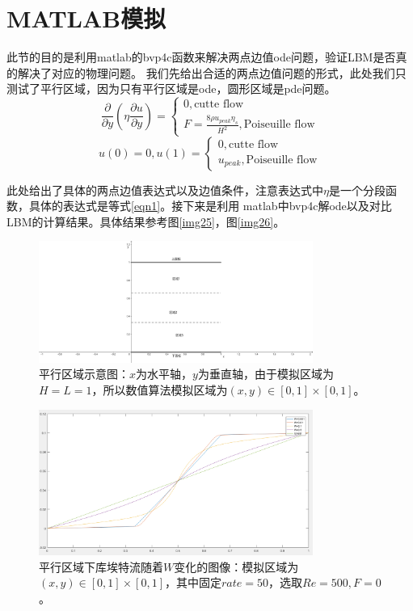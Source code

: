 \documentclass[11pt,UTF8]{ctexart}
\begin{document}
    \section{MATLAB模拟}
    \par{此节的目的是利用matlab的bvp4c函数来解决两点边值ode问题，验证LBM是否真的解决了对应的物理问题。
    我们先给出合适的两点边值问题的形式，此处我们只测试了平行区域，因为只有平行区域是ode，圆形区域是pde问题。}
    $$
    \frac{\partial}{\partial y} (\eta \frac{\partial u}{\partial y})=
    \begin{cases}
        0,\text{cutte flow}\\
        F = \frac{8\rho u_{peak} \eta_s}{H^2},\text{Poiseuille flow}
    \end{cases}
    $$
    $$
    u(0) = 0,u(1)=
    \begin{cases}
        0,\text{cutte flow}\\
        u_{peak},\text{Poiseuille flow}
    \end{cases}
    $$
    \par{此处给出了具体的两点边值表达式以及边值条件，注意表达式中$\eta$是一个分段函数，具体的表达式是等式\ref {eqn1}。接下来是利用
    matlab中bvp4c解ode以及对比LBM的计算结果。具体结果参考图\ref {img25}，图\ref {img26}。}
    \newpage
    \begin{figure}[h]
        \centerline{\includegraphics[width=0.8\textwidth]{parallel.png}}
        \caption{平行区域示意图：$x$为水平轴，$y$为垂直轴，由于模拟区域为$H=L=1$，所以数值算法模拟区域为$(x,y)\in [0,1]\times [0,1]$。}
        \label{img1}
    \end{figure}
    \begin{figure}[h]
        \centerline{\includegraphics[width=0.8\textwidth]{cutte_W.png}}
        \caption{平行区域下库埃特流随着$W$变化的图像：模拟区域为$(x,y)\in [0,1]\times [0,1]$，其中固定$rate=50$，选取$Re=500,F=0$。}
        \label{img2}
    \end{figure}
\end{document}
